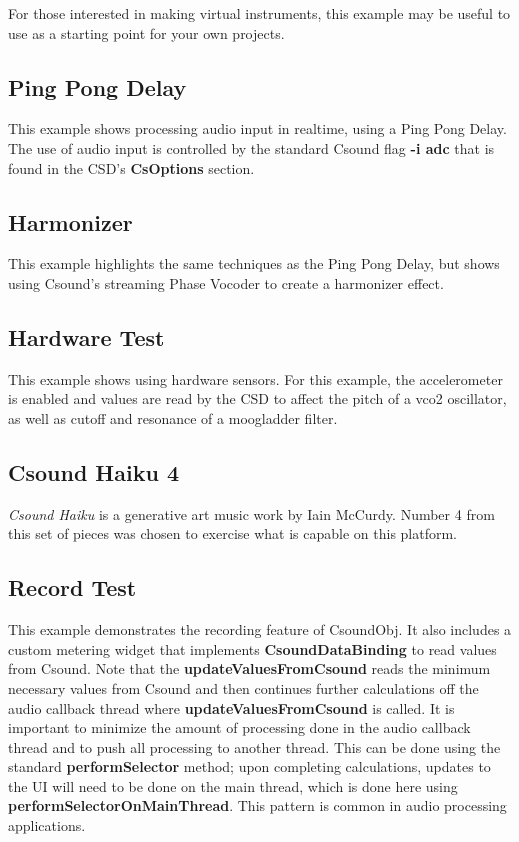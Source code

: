 \documentclass[11pt]{article}
\begin{document}
For those interested in making virtual instruments, this example may be useful to use as a starting point for your own projects.

\subsection{Ping Pong Delay}

This example shows processing audio input in realtime, using a Ping Pong Delay. The use of audio input is controlled by the standard Csound flag \textbf{-i adc} that is found in the CSD's \textbf{CsOptions} section.


\subsection{Harmonizer}

This example highlights the same techniques as the Ping Pong Delay, but shows using Csound's streaming Phase Vocoder to create a harmonizer effect.

\subsection{Hardware Test}

This example shows using hardware sensors.  For this example, the accelerometer is enabled and values are read by the CSD to affect the pitch of a vco2 oscillator, as well as cutoff and resonance of a moogladder filter.

\subsection{Csound Haiku 4}

\emph{Csound Haiku} is a generative art music work by Iain McCurdy.  Number 4 from this set of pieces was chosen to exercise what is capable on this platform.

\subsection{Record Test}

This example demonstrates the recording feature of CsoundObj.  It also includes a custom metering widget that implements \textbf{CsoundDataBinding} to read values from Csound.  Note that the \textbf{updateValuesFromCsound} reads the minimum necessary values from Csound and then continues further calculations off the audio callback thread where \textbf{updateValuesFromCsound} is called.  It is important to minimize the amount of processing done in the audio callback thread and to push all processing to another thread.  This can be done using the standard \textbf{performSelector} method; upon completing calculations, updates to the UI will need to be done on the main thread, which is done here using \textbf{performSelectorOnMainThread}.  This pattern is common in audio processing applications.
\end{document}
